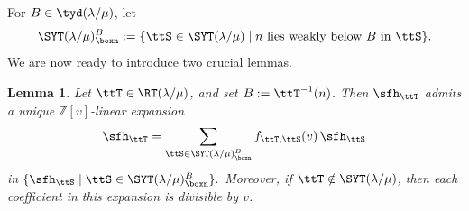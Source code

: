 \documentclass[12pt, reqno]{amsart}
\theoremstyle{plain}
\newtheorem{lemma}[lemma]{Lemma}
\theoremstyle{definition}
\numberwithin{equation}{section}
\numberwithin{figure}{section}
\numberwithin{table}{section}
\def\Z{\mathbb Z}
\begin{document}
For $B \in \tyd(\lambda/\mu)$, let 
\begin{equation}\label{def of SYTB}
\SYT(\lambda/\mu)^B_{\boxn} := 
\{\ttS \in \SYT(\lambda/\mu) \mid \text{$n$ lies weakly below $B$ in $\ttS$}  \}.
\end{equation}
We are now ready to introduce two crucial lemmas.


\begin{lemma}\label{lem: expansion of row-standard into standard basis}
Let $\ttT \in \RT(\lambda/\mu)$, and set $B := \ttT^{-1}(n)$.
Then $\sfh_{\ttT}$ admits a unique $\Z[v]$-linear expansion 
\begin{align}\label{eq: row standard h expansion}
\sfh_{\ttT}
=
\sum_{\ttS \in \SYT(\lambda/\mu)^{B}_{\boxn}}
f_{\ttT,\ttS}(v)\,\sfh_{\ttS}
\end{align}
in 
$\{\sfh_{\ttS} \mid \ttS \in \SYT(\lambda/\mu)^{B}_{\boxn}\}.$
Moreover, if $\ttT \notin \SYT(\lambda/\mu)$, then 
each coefficient in this expansion is divisible by $v$.
\end{lemma}
\end{document}
